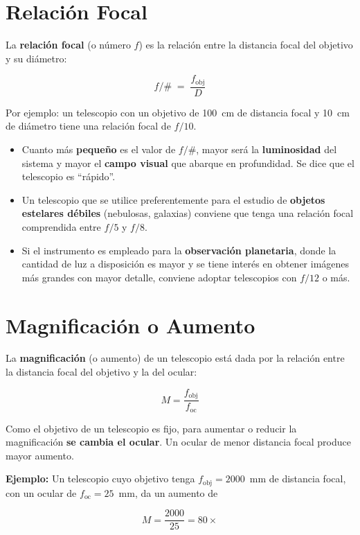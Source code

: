 \section{Relación Focal}

La \textbf{relación focal} (o número $f$) es la relación entre la distancia focal del objetivo y su diámetro:

$$f/\# \;=\; \frac{f_{\text{obj}}}{D}$$

Por ejemplo: un telescopio con un objetivo de 100~cm de distancia focal y 10~cm de diámetro tiene una relación focal de $f/10$.

\begin{itemize}
    \item Cuanto más \textbf{pequeño} es el valor de $f/\#$, mayor será la \textbf{luminosidad} del sistema y mayor el \textbf{campo visual} que abarque en profundidad. Se dice que el telescopio es ``rápido''.
    \item Un telescopio que se utilice preferentemente para el estudio de \textbf{objetos estelares débiles} (nebulosas, galaxias) conviene que tenga una relación focal comprendida entre $f/5$ y $f/8$.
    \item Si el instrumento es empleado para la \textbf{observación planetaria}, donde la cantidad de luz a disposición es mayor y se tiene interés en obtener imágenes más grandes con mayor detalle, conviene adoptar telescopios con $f/12$ o más.
\end{itemize}



\section{Magnificación o Aumento}

La \textbf{magnificación} (o aumento) de un telescopio está dada por la relación entre la distancia focal del objetivo y la del ocular:

$$M = \frac{f_{\text{obj}}}{f_{\text{oc}}}$$

Como el objetivo de un telescopio es fijo, para aumentar o reducir la magnificación \textbf{se cambia el ocular}. Un ocular de menor distancia focal produce mayor aumento.

\textbf{Ejemplo:} Un telescopio cuyo objetivo tenga $f_{\text{obj}} = 2000$~mm de distancia focal, con un ocular de $f_{\text{oc}} = 25$~mm, da un aumento de

$$M = \frac{2000}{25} = 80\times$$

